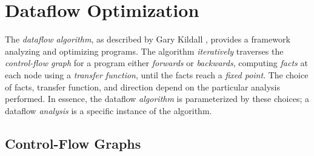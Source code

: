 \documentclass[12pt]{report}
\begin{document}

\renewcommand{\textfraction}{0.1}
\renewcommand{\topfraction}{0.9}

\chapter{Dataflow Optimization}
\label{ref_chapter_background}


The \emph{dataflow algorithm}, as described by Gary Kildall
\citep{Kildall1973}, provides a framework analyzing and optimizing
programs.  The algorithm \emph{iteratively} traverses the
\emph{control-flow graph} for a program either \emph{forwards} or
\emph{backwards}, computing \emph{facts} at each node using a
\emph{transfer function}, until the facts reach a \emph{fixed
  point}. The choice of facts, transfer function, and direction depend
on the particular analysis performed. In essence, the dataflow
\emph{algorithm} is parameterized by these choices; a dataflow
\emph{analysis} is a specific instance of the algorithm.


\section{Control-Flow Graphs}
\label{sec_back1}

\end{document}
